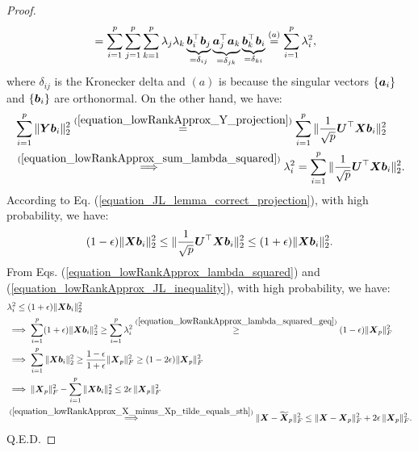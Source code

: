 \documentclass{article}
\def\b{\ensuremath\boldsymbol}
\begin{document}
\begin{proof}
\begin{align}
&= \sum_{i=1}^p \sum_{j=1}^p \sum_{k=1}^p \lambda_j \lambda_k \underbrace{\b{b}_i^\top \b{b}_j}_{=\delta_{ij}} \underbrace{\b{a}_j^\top \b{a}_k}_{=\delta_{jk}} \underbrace{\b{b}_k^\top \b{b}_i}_{=\delta_{ki}} \overset{(a)}{=} \sum_{i=1}^p \lambda_i^2, \label{equation_lowRankApprox_sum_lambda_squared}
\end{align}
where $\delta_{ij}$ is the Kronecker delta and $(a)$ is because the singular vectors $\{\b{a}_i\}$ and $\{\b{b}_i\}$ are orthonormal. 
On the other hand, we have:
\begin{align}
&\sum_{i=1}^p \|\b{Y} \b{b}_i\|_2^2 \overset{(\ref{equation_lowRankApprox_Y_projection})}{=} \sum_{i=1}^p \|\frac{1}{\sqrt{p}} \b{U}^\top \b{X} \b{b}_i\|_2^2 \nonumber \\
&\overset{(\ref{equation_lowRankApprox_sum_lambda_squared})}{\implies} \lambda_i^2 = \sum_{i=1}^p \|\frac{1}{\sqrt{p}} \b{U}^\top \b{X} \b{b}_i\|_2^2. \label{equation_lowRankApprox_lambda_squared}
\end{align}
According to Eq. (\ref{equation_JL_lemma_correct_projection}), with high probability, we have:
\begin{align}\label{equation_lowRankApprox_JL_inequality}
(1-\epsilon) \|\b{X}\b{b}_i\|_2^2 \leq \|\frac{1}{\sqrt{p}} \b{U}^\top \b{X} \b{b}_i\|_2^2 \leq (1+\epsilon) \|\b{X}\b{b}_i\|_2^2.
\end{align}
From Eqs. (\ref{equation_lowRankApprox_lambda_squared}) and (\ref{equation_lowRankApprox_JL_inequality}), with high probability, we have:
\begin{align*}
&\lambda_i^2 \leq (1+\epsilon) \|\b{X}\b{b}_i\|_2^2 \\
&\implies \sum_{i=1}^p (1+\epsilon) \|\b{X}\b{b}_i\|_2^2 \geq \sum_{i=1}^p \lambda_i^2 \overset{(\ref{equation_lowRankApprox_lambda_squared_geq})}{\geq} (1 - \epsilon) \|\b{X}_p\|_F^2 \\
&\implies \sum_{i=1}^p \|\b{X}\b{b}_i\|_2^2 \geq \frac{1-\epsilon}{1+\epsilon} \|\b{X}_p\|_F^2 \geq (1-2\epsilon) \|\b{X}_p\|_F^2 \\
&\implies \|\b{X}_p\|_F^2 - \sum_{i=1}^p \|\b{X} \b{b}_i\|_2^2 \leq 2\epsilon\, \|\b{X}_p\|_F^2 \\
&\overset{(\ref{equation_lowRankApprox_X_minus_Xp_tilde_equals_sth})}{\implies} \|\b{X} - \widetilde{\b{X}}_p\|_F^2 \leq \|\b{X} - \b{X}_p\|_F^2 + 2\epsilon\, \|\b{X}_p\|_F^2.
\end{align*}
Q.E.D.
\end{proof}
\end{document}
